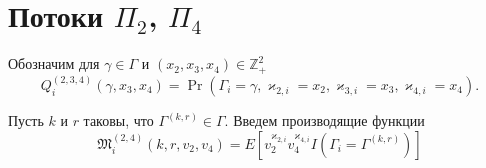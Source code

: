 \documentclass[a4paper,12pt,russian]{extarticle}
\begin{document}
\section{Потоки $\Pi_2$, $\Pi_4$}



Обозначим для $\gamma \in \Gamma$ и $(x_2, x_3, x_4) \in {\mathbb Z}_+^2$
\begin{equation}
Q^{(2,3,4)}_{i}(\gamma,x_3,x_4) = \Pr(\Gamma_{i}=\gamma, \varkappa_{2,i}=x_2, \varkappa_{3,i}=x_3, \varkappa_{4,i}=x_4).
\end{equation}

Пусть $k$ и $r$ таковы, что $\Gamma^{(k,r)}\in \Gamma$. Введем производящие функции
\begin{equation*}
\mathfrak{M}^{(2,4)}_i(k,r,v_2, v_4) = E[v_2^{\varkappa_{2,i}} v_4^{\varkappa_{4,i}} I(\Gamma_{i}=\Gamma^{(k,r)})]
\end{equation*}
\end{document}
